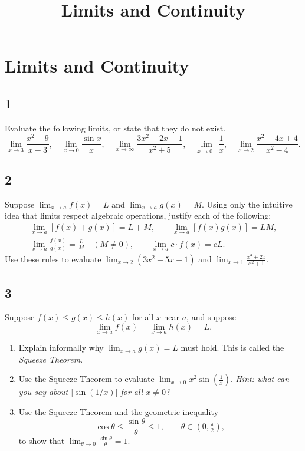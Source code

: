 \documentclass[11pt,oneside,reqno]{amsbook}
\title{Limits and Continuity}
\numberwithin{equation}{section}
\theoremstyle{definition}
\theoremstyle{remark}
\begin{document}
\section*{Limits and Continuity}

\subsection*{1} Evaluate the following limits, or state that they do not exist.
\[
\lim_{x \to 3} \frac{x^2 - 9}{x - 3}, \quad
\lim_{x \to 0} \frac{\sin x}{x}, \quad
\lim_{x \to \infty} \frac{3x^2 - 2x + 1}{x^2 + 5}, \quad
\lim_{x \to 0^+} \frac{1}{x}, \quad
\lim_{x \to 2} \frac{x^2 - 4x + 4}{x^2 - 4}.
\]

\subsection*{2} Suppose $\displaystyle\lim_{x \to a} f(x) = L$ and $\displaystyle\lim_{x \to a} g(x) = M$. Using only the intuitive idea that limits respect algebraic operations, justify each of the following:
\begin{gather*}
\lim_{x \to a}[f(x) + g(x)] = L + M, \qquad \lim_{x \to a}[f(x)g(x)] = LM, \\
\lim_{x \to a}\frac{f(x)}{g(x)} = \frac{L}{M} \quad (M \neq 0), \qquad \lim_{x \to a} c \cdot f(x) = cL.
\end{gather*}
Use these rules to evaluate $\displaystyle\lim_{x \to 2}(3x^2 - 5x + 1)$ and $\displaystyle\lim_{x \to 1} \frac{x^3 + 2x}{x^2 + 1}$.

\subsection*{3} Suppose $f(x) \leq g(x) \leq h(x)$ for all $x$ near $a$, and suppose
\[
\lim_{x \to a} f(x) = \lim_{x \to a} h(x) = L.
\]
\begin{enumerate}[label=(\alph*)]
    \item Explain informally why $\displaystyle\lim_{x \to a} g(x) = L$ must hold. This is called the \textit{Squeeze Theorem}.
    \item Use the Squeeze Theorem to evaluate $\displaystyle\lim_{x \to 0} x^2 \sin\!\left(\frac{1}{x}\right)$.
    \textit{Hint: what can you say about $|\sin(1/x)|$ for all $x \neq 0$?}
    \item Use the Squeeze Theorem and the geometric inequality
    \[
    \cos\theta \leq \frac{\sin\theta}{\theta} \leq 1, \qquad \theta \in \left(0, \tfrac{\pi}{2}\right),
    \]
    to show that $\displaystyle\lim_{\theta \to 0} \frac{\sin\theta}{\theta} = 1$.
\end{enumerate}
\end{document}
